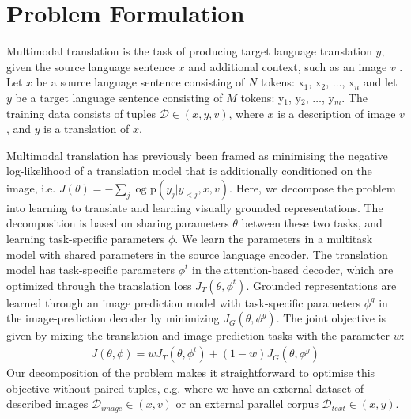 \section{Problem Formulation}\label{sec:problem}

Multimodal translation is the task of producing target language translation $y$, given the source language sentence $x$ and additional context, such as an image $v$ \citep{Specia2016}. Let $x$ be a source language sentence consisting of $N$ tokens: x$_1$, x$_2$, $\ldots$, x$_n$ and let $y$ be a target language sentence consisting of $M$ tokens: y$_1$, y$_2$, $\ldots$, y$_m$. The training data consists of tuples $\mathcal{D} \in (x, y, v)$, where $x$ is a description of image $v$, and $y$ is a translation of $x$.

Multimodal translation has previously been framed as minimising the negative log-likelihood of a translation model that is additionally conditioned on the image, i.e. $J(\theta) = - \sum_{j} \text{log p}(y_j|y_{<j}, x, v)$. Here, we decompose the problem into learning to translate and learning visually grounded representations. The decomposition is based on sharing parameters $\theta$ between these two tasks, and learning task-specific parameters $\phi$. We learn the parameters in a multitask model with shared parameters in the source language encoder. The translation model has task-specific parameters $\phi^t$ in the attention-based decoder, which are optimized through the translation loss $J_{T}(\theta, \phi^t)$.
Grounded representations are learned through an image prediction model with task-specific parameters $\phi^g$ in the image-prediction
decoder by minimizing $J_{G}(\theta, \phi^g)$. The joint objective is given by mixing the translation and image prediction tasks with the parameter $w$:
%
\begin{align}
	J(\theta, \phi) = w J_{T}(\theta, \phi^{t}) +  (1 - w) J_G(\theta, \phi^{g})
\end{align}
%
Our decomposition of the problem makes it straightforward to optimise this objective without paired tuples, e.g. where we have an external dataset of described images $\mathcal{D}_{image} \in (x, v)$ or an external parallel corpus $\mathcal{D}_{text} \in (x, y)$.


